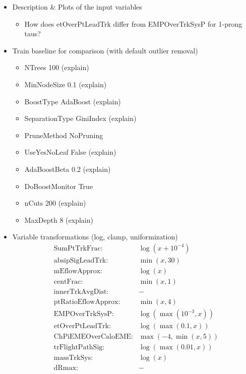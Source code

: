 \begin{itemize}
\item Description \& Plots of the input variables
  \begin{itemize}
  \item How does etOverPtLeadTrk differ from EMPOverTrkSysP for 1-prong taus?
  \end{itemize}

\item Train baseline for comparison (with default outlier removal)
  \begin{itemize}
  \item NTrees 100 (explain)
  \item MinNodeSize 0.1 (explain)
  \item BoostType AdaBoost (explain)
  \item SeparationType GiniIndex (explain)
  \item PruneMethod NoPruning
  \item UseYesNoLeaf False (explain)
  \item AdaBoostBeta 0.2 (explain)
  \item DoBoostMonitor True
  \item nCuts 200 (explain)
  \item MaxDepth 8 (explain)
  \end{itemize}

\item Variable transformations (log, clamp, uniformization)
  \begin{align}
    &\text{SumPtTrkFrac:} &\log(x + 10^{-4}) \\
    &\text{absipSigLeadTrk:} &\min(x, 30) \\
    &\text{mEflowApprox:} &\log(x) \\
    &\text{centFrac:} &\min(x, 1) \\
    &\text{innerTrkAvgDist:} &- \\
    &\text{ptRatioEflowApprox:} &\min(x, 4) \\
    &\text{EMPOverTrkSysP:} &\log(\max(10^{-3}, x)) \\
    &\text{etOverPtLeadTrk:} &\log(\max(0.1, x)) \\
    &\text{ChPiEMEOverCaloEME:} &\max(-4, \min(x, 5)) \\
    &\text{trFlightPathSig:} &\log(\max(0.01, x)) \\
    &\text{massTrkSys:} &\log(x) \\
    &\text{dRmax:} &-
  \end{align}


\end{itemize}
